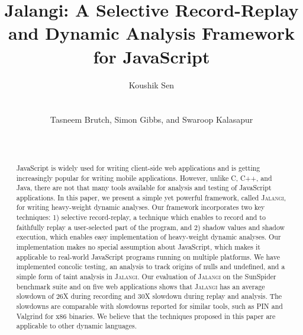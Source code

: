 \documentclass{sig-alternate}
\def\jalangi{\textsc{Jalangi}}
\begin{document}

\title{Jalangi: A Selective Record-Replay and Dynamic Analysis
  Framework for JavaScript} 

\author{
\alignauthor
Koushik Sen\\
      \\
      \\
\alignauthor
Tasneem Brutch,  Simon Gibbs, and  Swaroop Kalasapur\\
\\
\\
}
\maketitle
\sloppy

\begin{abstract}
  JavaScript is widely used for writing client-side web applications
  and is getting increasingly popular for writing mobile applications.
  However, unlike C, C++, and Java, there are not that many tools
  available for analysis and testing of JavaScript applications.  In
  this paper, we present a simple yet powerful framework, called
  \jalangi{}, for writing heavy-weight dynamic analyses.  Our
  framework incorporates two key techniques: 1) selective
  record-replay, a technique which enables to record and to faithfully
  replay a user-selected part of the program, and 2) shadow values and
  shadow execution, which enables easy implementation of heavy-weight
  dynamic analyses.  Our implementation makes no special assumption
  about JavaScript, which makes it applicable to real-world JavaScript
  programs running on multiple platforms.  We have implemented
  concolic testing, an analysis to track origins of nulls and
  undefined, and a simple form of taint analysis in \jalangi{}.  Our
  evaluation of \jalangi{} on the SunSpider benchmark suite and on
  five web applications shows that \jalangi{} has an average slowdown
  of 26X during recording and 30X slowdown during replay and analysis.
  The slowdowns are comparable with slowdowns reported for similar
  tools, such as PIN and Valgrind for x86 binaries.  We believe that
  the techniques proposed in this paper are applicable to other
  dynamic languages.
\end{abstract}
\end{document}
